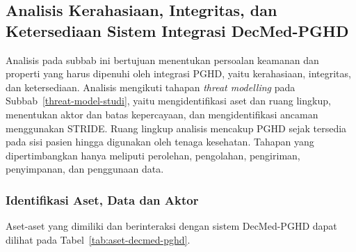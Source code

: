 
\subsection{Analisis Kerahasiaan, Integritas, dan Ketersediaan Sistem Integrasi DecMed-PGHD}\label{analisis-cia-decmed-pghd}

Analisis pada subbab ini bertujuan menentukan persoalan keamanan dan properti yang harus dipenuhi oleh integrasi PGHD, yaitu kerahasiaan, integritas, dan ketersediaan.
Analisis mengikuti tahapan \textit{threat modelling} pada Subbab~\ref{threat-model-studi}, yaitu mengidentifikasi aset dan ruang lingkup, menentukan aktor dan batas kepercayaan, dan mengidentifikasi ancaman menggunakan STRIDE\@.
Ruang lingkup analisis mencakup PGHD sejak tersedia pada sisi pasien hingga digunakan oleh tenaga kesehatan.
Tahapan yang dipertimbangkan hanya meliputi perolehan, pengolahan, pengiriman, penyimpanan, dan penggunaan data.

\subsubsection{Identifikasi Aset, Data dan Aktor}

Aset-aset yang dimiliki dan berinteraksi dengan sistem DecMed-PGHD dapat dilihat pada Tabel~\ref{tab:aset-decmed-pghd}.

